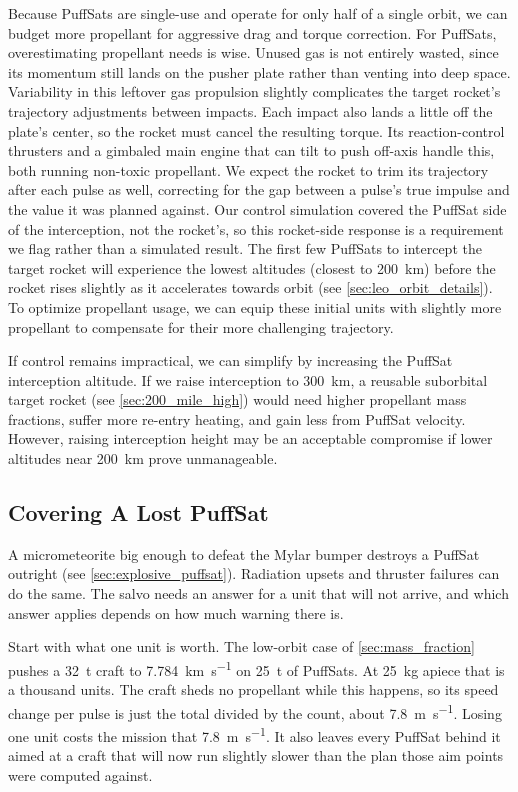 \documentclass{article}
\begin{document}
Because PuffSats are single-use and operate for only half of a single orbit, we can budget more propellant for aggressive drag and torque correction. For PuffSats, overestimating propellant needs is wise. Unused gas is not entirely wasted, since its momentum still lands on the pusher plate rather than venting into deep space. Variability in this leftover gas propulsion slightly complicates the target rocket's trajectory adjustments between impacts. Each impact also lands a little off the plate's center, so the rocket must cancel the resulting torque. Its reaction-control thrusters and a gimbaled main engine that can tilt to push off-axis handle this, both running non-toxic propellant. We expect the rocket to trim its trajectory after each pulse as well, correcting for the gap between a pulse's true impulse and the value it was planned against. Our control simulation covered the PuffSat side of the interception, not the rocket's, so this rocket-side response is a requirement we flag rather than a simulated result. The first few PuffSats to intercept the target rocket will experience the lowest altitudes (closest to \SI{200}{\kilo\meter}) before the rocket rises slightly as it accelerates towards orbit (see \autoref{sec:leo_orbit_details}). To optimize propellant usage, we can equip these initial units with slightly more propellant to compensate for their more challenging trajectory.

If control remains impractical, we can simplify by increasing the PuffSat interception altitude. If we raise interception to \SI{300}{\kilo\meter}, a reusable suborbital target rocket (see \autoref{sec:200_mile_high}) would need higher propellant mass fractions, suffer more re-entry heating, and gain less from PuffSat velocity. However, raising interception height may be an acceptable compromise if lower altitudes near \SI{200}{\kilo\meter} prove unmanageable.

\subsection{Covering A Lost PuffSat}\label{sec:lost_puffsat}
A micrometeorite big enough to defeat the Mylar bumper destroys a PuffSat outright (see \autoref{sec:explosive_puffsat}). Radiation upsets and thruster failures can do the same. The salvo needs an answer for a unit that will not arrive, and which answer applies depends on how much warning there is.

Start with what one unit is worth. The low-orbit case of \autoref{sec:mass_fraction} pushes a \SI{32}{\tonne} craft to \SI{7.784}{\kilo\meter\per\second} on \SI{25}{\tonne} of PuffSats. At \SI{25}{\kilo\gram} apiece that is a thousand units. The craft sheds no propellant while this happens, so its speed change per pulse is just the total divided by the count, about \SI{7.8}{\meter\per\second}. Losing one unit costs the mission that \SI{7.8}{\meter\per\second}. It also leaves every PuffSat behind it aimed at a craft that will now run slightly slower than the plan those aim points were computed against.
\end{document}
